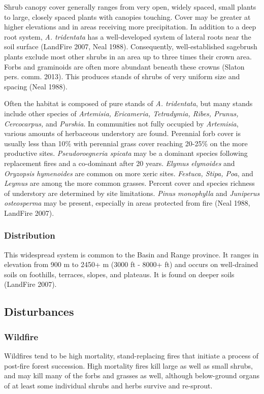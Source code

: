 Shrub canopy cover generally ranges from very open, widely spaced, small plants to large, closely spaced plants with canopies touching. Cover may be greater at higher elevations and in areas receiving more precipitation. In addition to a deep root system, \emph{A. tridentata} has a well-developed system of lateral roots near the soil surface (LandFire 2007, Neal 1988). Consequently, well-established sagebrush plants exclude most other shrubs in an area up to three times their crown area. Forbs and graminoids are often more abundant beneath these crowns (Slaton pers. comm. 2013). This produces stands of shrubs of very uniform size and spacing (Neal 1988).

Often the habitat is composed of pure stands of \emph{A. tridentata}, but many stands include other species of \emph{Artemisia, Ericameria, Tetradymia, Ribes, Prunus, Cercocarpus,} and \emph{Purshia}. In communities not fully occupied by \emph{Artemisia}, various amounts of herbaceous understory are found. Perennial forb cover is usually less than 10\% with perennial grass cover reaching 20-25\% on the more productive sites. \emph{Pseudoroegneria spicata} may be a dominant species following replacement fires and a co-dominant after 20 years. \emph{Elymus elymoides} and \emph{Oryzopsis hymenoides} are common on more xeric sites. \emph{Festuca, Stipa, Poa}, and \emph{Leymus} are among the more common grasses. Percent cover and species richness of understory are determined by site limitations. \emph{Pinus monophylla} and \emph{Juniperus osteosperma} may be present, especially in areas protected from fire (Neal 1988, LandFire 2007).


\subsubsection{Distribution}
This widespread system is common to the Basin and Range province. It ranges in elevation from 900 m to 2450+ m (3000 ft - 8000+ ft) and occurs on well-drained soils on foothills, terraces, slopes, and plateaus. It is found on deeper soils (LandFire 2007).

\subsection*{Disturbances}


\subsubsection{Wildfire}
Wildfires tend to be high mortality, stand-replacing fires that initiate a process of post-fire forest succession. High mortality fires kill large as well as small shrubs, and may kill many of the forbs and grasses as well, although below-ground organs of at least some individual shrubs and herbs survive and re-sprout. 

